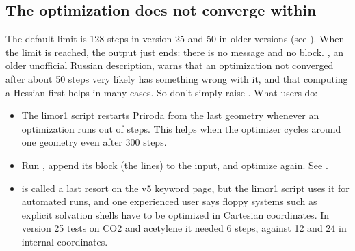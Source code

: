 \documentclass[letterpaper,10pt,english,openany,oneside]{sphinxmanual}
\begin{document}
\subsection{The optimization does not converge within }
\label{\detokenize{troubleshooting/common-problems:the-optimization-does-not-converge-within-steps}}
\sphinxAtStartPar
The default limit is 128 steps in version 25 and 50 in older versions (see {\hyperref[\detokenize{reference/optimize:optimize-steps}]{}}). When the
limit is reached, the output just ends: there is no message and no  block. , an older unofficial
Russian description, warns that an optimization not converged after about 50 steps very likely has something wrong
with it, and that computing a Hessian first helps in many cases. So don’t simply raise . What users do:


\begin{itemize}
\item {} 
\sphinxAtStartPar
{} The limor1  script restarts Priroda from the last geometry whenever an
optimization runs out of steps. This helps when the optimizer cycles around one geometry even after 300 steps.



\item {} 
\sphinxAtStartPar
{} Run , append its  block (the  lines) to the input, and optimize
again. See {\hyperref[\detokenize{reference/Energy:group-energy}]{}}. 

\item {} 
\sphinxAtStartPar
{} {\hyperref[\detokenize{reference/optimize:optimize-cartesian}]{}} is called a last resort on the v5 keyword
page, but the limor1  script uses it for automated runs, and one experienced user says floppy systems
such as explicit solvation shells have to be optimized in Cartesian coordinates. In version 25 tests on CO2 and
acetylene it needed 6 steps, against 12 and 24 in internal coordinates.



\end{itemize}
\end{document}
